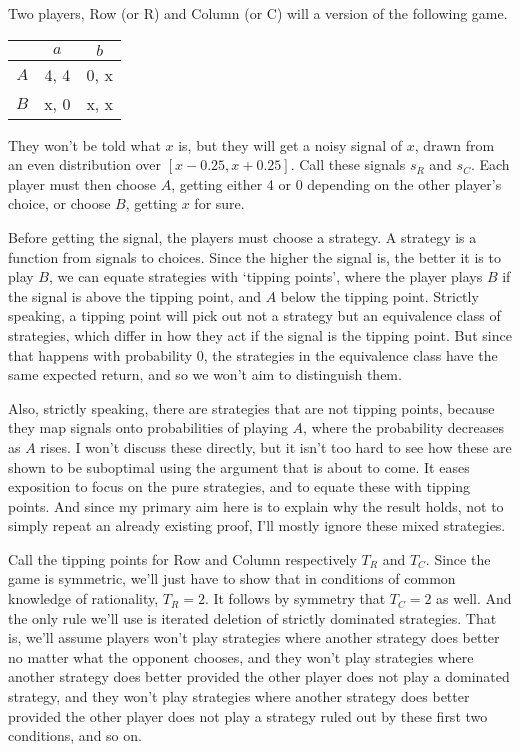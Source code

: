\documentclass{article}
\begin{document}
Two players, Row (or R) and Column (or C) will a version of the following game.

\begin{center}
\begin{tabular}{r | c c}
& $a$ & $b$ \\\hline
$A$ & 4, 4 & 0, x \\
$B$ & x, 0 & x, x
\end{tabular}
\end{center}
They won't be told what $x$ is, but they will get a noisy signal of $x$, drawn from an even distribution over $[x - 0.25, x + 0.25]$. Call these signals $s_R$ and $s_C$. Each player must then choose $A$, getting either 4 or 0 depending on the other player's choice, or choose $B$, getting $x$ for sure. 

Before getting the signal, the players must choose a strategy. A strategy is a function from signals to choices. Since the higher the signal is, the better it is to play $B$, we can equate strategies with `tipping points', where the player plays $B$ if the signal is above the tipping point, and $A$ below the tipping point. Strictly speaking, a tipping point will pick out not a strategy but an equivalence class of strategies, which differ in how they act if the signal is the tipping point. But since that happens with probability 0, the strategies in the equivalence class have the same expected return, and so we won't aim to distinguish them.

Also, strictly speaking, there are strategies that are not tipping points, because they map signals onto probabilities of playing $A$, where the probability decreases as $A$ rises. I won't discuss these directly, but it isn't too hard to see how these are shown to be suboptimal using the argument that is about to come. It eases exposition to focus on the pure strategies, and to equate these with tipping points. And since my primary aim here is to explain why the result holds, not to simply repeat an already existing proof, I'll mostly ignore these mixed strategies.

Call the tipping points for Row and Column respectively $T_R$ and $T_C$. Since the game is symmetric, we'll just have to show that in conditions of common knowledge of rationality, $T_R = 2$. It follows by symmetry that $T_C = 2$ as well. And the only rule we'll use is iterated deletion of strictly dominated strategies. That is, we'll assume players won't play strategies where another strategy does better no matter what the opponent chooses, and they won't play strategies where another strategy does better provided the other player does not play a dominated strategy, and they won't play strategies where another strategy does better provided the other player does not play a strategy ruled out by these first two conditions, and so on.
\end{document}

